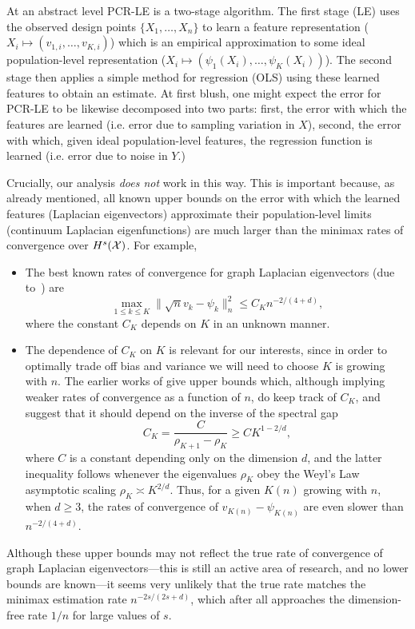 At an abstract level PCR-LE is a two-stage algorithm. The first stage (LE) uses the observed design points $\{X_1,\ldots,X_n\}$ to learn a feature representation ($X_i \mapsto (v_{1,i},\ldots,v_{K,i})$) which is an empirical approximation to some ideal population-level representation ($X_i \mapsto (\psi_{1}(X_i),\ldots,\psi_{K}(X_i))$).  The second stage then applies a simple method for regression (OLS) using these learned features to obtain an estimate. At first blush, one might expect the error for PCR-LE to be likewise decomposed into two parts: first, the error with which the features are learned (i.e. error due to sampling variation in $X$), second, the error with which, given ideal population-level features, the regression function is learned (i.e. error due to noise in $Y$.) 

Crucially, our analysis \emph{does not} work in this way. This is important because, as already mentioned, all known upper bounds on the error with which the learned features (Laplacian eigenvectors) approximate their population-level limits (continuum Laplacian eigenfunctions) are much larger than the minimax rates of convergence over $H^s(\mathcal{X})$. For example,
\begin{itemize}
	\item The best known rates of convergence for graph Laplacian eigenvectors (due to~\cite{cheng2021}) are
	\begin{equation}
	\label{eqn:eigenvector_convergence}
	\max_{1 \leq k \leq K}\|\sqrt{n}v_k - \psi_k\|_n^2 \leq C_{K} n^{-2/(4 + d)},
	\end{equation}
	where the constant $C_K$ depends on $K$ in an unknown manner.
	\item The dependence of $C_K$ on $K$ is relevant for our interests, since in order to optimally trade off bias and variance we will need to choose $K$ is growing with $n$. The earlier works of \cite{burago2014,trillos2019} give upper bounds which, although implying weaker rates of convergence as a function of $n$, do keep track of $C_K$, and suggest that it should depend on the inverse of the spectral gap 
	\begin{equation}
	\label{eqn:spectral_gap}
	C_K = \frac{C}{\rho_{K + 1} - \rho_K} \geq C K^{1 - 2/d},
	\end{equation}
	where $C$ is a constant depending only on the dimension $d$, and the latter inequality follows whenever the eigenvalues $\rho_K$ obey the Weyl's Law asymptotic scaling $\rho_K \asymp K^{2/d}$. Thus, for a given $K(n)$ growing with $n$, when $d \geq 3$, the rates of convergence of $v_{K(n)} - \psi_{K(n)}$ are even slower than $n^{-2/(4 + d)}$. 
\end{itemize}
Although these upper bounds may not reflect the true rate of convergence of graph Laplacian eigenvectors---this is still an active area of research, and no lower bounds are known---it seems very unlikely that the true rate matches the minimax estimation rate $n^{-2s/(2s + d)}$, which after all approaches the dimension-free rate $1/n$ for large values of $s$. 


